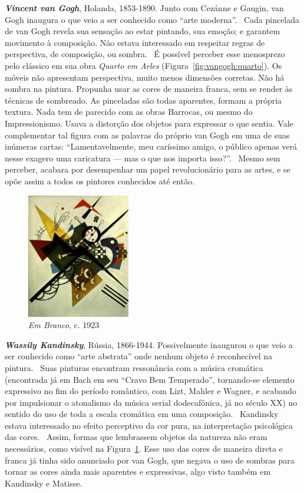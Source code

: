 \textbf{\emph{Vincent van Gogh}}, Holanda, 1853-1890. Junto com Cezánne e
Gaugin, van Gogh inaugura o que veio a ser conhecido como ``arte
moderna''.~\cite{gombrich} Cada pincelada de van Gogh revela sua sensação ao
estar pintando, sua emoção; e garantem movimento à composição. Não estava
interessado em respeitar regras de perspectiva, de composição, ou
sombra.~\cite{hulsker} É possível perceber esse menosprezo pelo clássico em sua
obra \textit{Quarto em Arles} (Figura~\ref{fig:vangogh:quarto}). Os móveis não
apresentam perspectiva, muito menos dimensões corretas. Não há sombra na
pintura. Propunha usar as cores de maneira franca, sem se render às técnicas de
sombreado. As pinceladas são todas aparentes, formam a própria textura. Nada tem
de parecido com as obras Barrocas, ou mesmo do Impressionismo. Usava a distorção
dos objetos para expressar o que sentia. Vale complementar tal figura com as
palavras do próprio van Gogh em uma de suas inúmeras cartas: ``Lamentavelmente,
meu caríssimo amigo, o público apenas verá nesse exagero uma caricatura --- mas
o que nos importa isso?''.~\cite{van1958} Mesmo sem perceber, acabara por
desempenhar um papel revolucionário para as artes, e se opõe assim a todos os
pintores conhecidos até então.

\begin{figure}
  \begin{center}
    \includegraphics[width=0.4\textwidth]{figs/kandinsky_white.png}
  \end{center}
  \caption{\emph{Em Branco}, c. 1923}
  \label{fig:kandinsky:white}
\end{figure}

\textbf{\emph{Wassily Kandinsky}}, Rússia, 1866-1944. Possivelmente inaugurou o
que veio a ser conhecido como ``arte abstrata'' onde nenhum objeto é
reconhecível na pintura.~\cite{duchting} Suas pinturas encontram ressonância com
a música cromática (encontrada já em Bach em seu ``Cravo Bem Temperado'',
tornando-se elemento expressivo no fim do período romântico, com Lizt, Mahler e
Wagner, e acabando por impulsionar o atonalismo da música serial dodecafônica,
já no século XX) no sentido do uso de toda a escala cromática em uma
composição.~\cite{gombrich} Kandinsky estava interessado no efeito perceptivo da
cor pura, na interpretação psicológica das cores.~\cite{ione} Assim, formas que
lembrassem objetos da natureza não eram necessários, como visível na
Figura~\ref{fig:kandinsky:white}. Esse uso das cores de maneira direta e franca
já tinha sido anunciado por van Gogh, que negava o uso de sombras para tornar as
cores ainda mais aparentes e expressivas, algo visto também em Kandinsky e
Matisse.


